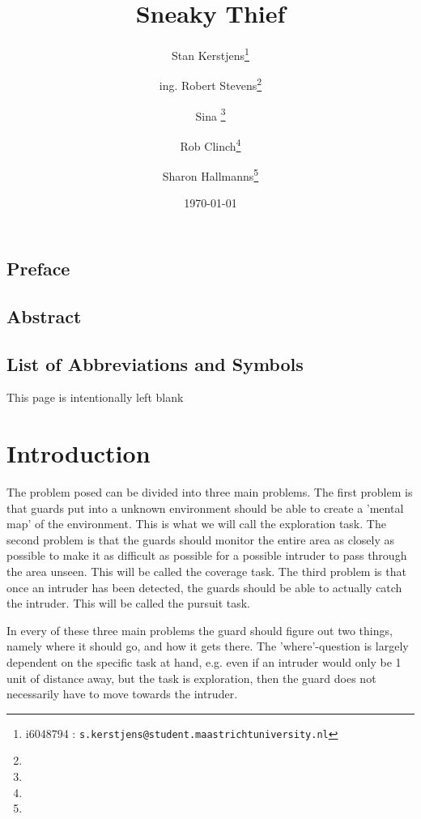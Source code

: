 \documentclass{report}
\title{Sneaky Thief}
\author{Stan Kerstjens\thanks{i6048794 : \texttt{s.kerstjens@student.maastrichtuniversity.nl}}}
\author{ing. Robert Stevens\thanks{}} %
\author{Sina \thanks{}} %
\author{Rob Clinch\thanks{}}
\author{Sharon Hallmanns\thanks{}} %
\affil{Department of Knowledge Engineering, Maastricht University}
\date{\today}
\begin{document}
\maketitle

\section*{Preface}
\section*{Abstract}
\listoffigures
\section*{List of Abbreviations and Symbols}
\tableofcontents\newpage



\newpage
\begin{center} 
	This page is intentionally left blank 
\end{center}

\newpage

\chapter{Introduction}




	The problem posed can be divided into three main problems. The first problem is that guards put into a unknown environment should be able to create a 'mental map' of the environment. This is what we will call the exploration task. The second problem is that the guards should monitor the entire area as closely as possible to make it as difficult as possible for a possible intruder to pass through the area unseen. This will be called the coverage task. The third problem is that once an intruder has been detected, the guards should be able to actually catch the intruder. This will be called the pursuit task.

	In every of these three main problems the guard should figure out two things, namely where it should go, and how it gets there. The 'where'-question is largely dependent on the specific task at hand, e.g. even if an intruder would only be 1 unit of distance away, but the task is exploration, then the guard does not necessarily have to move towards the intruder.
\end{document}
